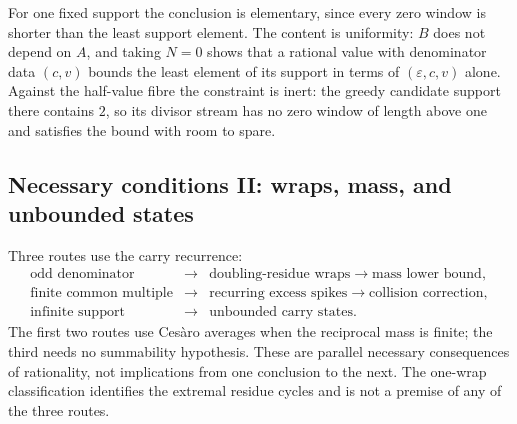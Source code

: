 \documentclass[11pt]{article}
\theoremstyle{definition}
\theoremstyle{remark}
\begin{document}
For one fixed support the conclusion is elementary, since every zero window
is shorter than the least support element.  The content is uniformity:
\(B\) does not depend on \(A\), and taking \(N=0\) shows that a rational
value with denominator data \((c,v)\) bounds the least element of its
support in terms of \((\varepsilon,c,v)\) alone.  Against the half-value
fibre the constraint is inert: the greedy candidate support there contains
\(2\), so its divisor stream has no zero window of length above one and
satisfies the bound with room to spare.

\subsection{Necessary conditions II: wraps, mass, and unbounded states}
\label{app:carry-mass}

Three routes use the carry recurrence:
\[
\begin{array}{rcl}
\text{odd denominator}&\longrightarrow&
  \text{doubling-residue wraps}\longrightarrow\text{mass lower bound},\\
\text{finite common multiple}&\longrightarrow&
  \text{recurring excess spikes}\longrightarrow\text{collision correction},\\
\text{infinite support}&\longrightarrow&\text{unbounded carry states}.
\end{array}
\]
The first two routes use Ces\`aro averages when the reciprocal mass is finite;
the third needs no summability hypothesis.  These are parallel necessary
consequences of rationality, not implications from one conclusion to the
next.  The one-wrap classification identifies the extremal residue cycles
and is not a premise of any of the three routes.
\end{document}
